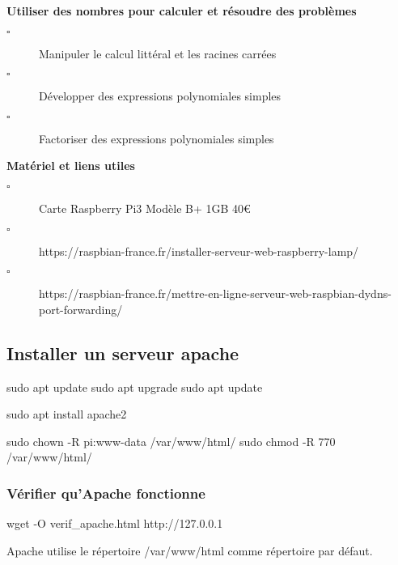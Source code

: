 \documentclass[20pt]{article}
\begin{document}
 \begin{titre}

\end{titre}


\begin{CpsCol}
\textbf{Utiliser des nombres pour calculer et résoudre des problèmes}
\begin{description}
\item[$\square$] Manipuler le calcul littéral et les racines carrées
\item[$\square$] Développer des expressions polynomiales simples
\item[$\square$] Factoriser des expressions polynomiales simples
\end{description}
\end{CpsCol}


\begin{CpsCol}
\textbf{Matériel et liens utiles}
\begin{description}
\item[$\square$] Carte Raspberry Pi3 Modèle B+ 1GB 40€
\item[$\square$] https://raspbian-france.fr/installer-serveur-web-raspberry-lamp/
\item[$\square$] https://raspbian-france.fr/mettre-en-ligne-serveur-web-raspbian-dydns-port-forwarding/
\end{description}
\end{CpsCol}



\subsection{Installer un serveur apache}

sudo apt update
sudo apt upgrade
sudo apt update

sudo apt install apache2

sudo chown -R pi:www-data /var/www/html/
sudo chmod -R 770 /var/www/html/


\subsubsection{Vérifier qu'Apache fonctionne}

wget -O verif_apache.html http://127.0.0.1


\begin{Rq}
Apache utilise le répertoire /var/www/html comme répertoire par défaut.
\end{Rq}
\end{document}
